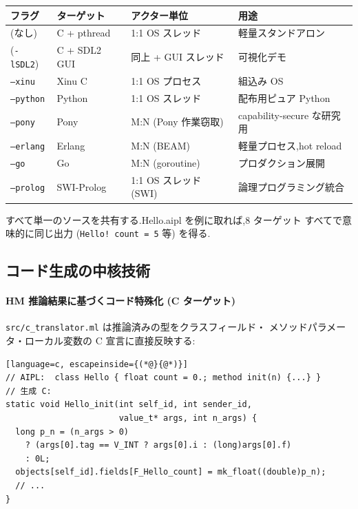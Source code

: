 \documentclass[11pt,a4paper]{article}
\newcommand{\code}[1]{\texttt{\small #1}}
\begin{document}
\begin{longtable}{p{2.7cm} p{2.5cm} p{4.5cm} p{5.5cm}}
  \toprule
  \textbf{フラグ} & \textbf{ターゲット} & \textbf{アクター単位} & \textbf{用途} \\
  \midrule
  \endhead
  (なし)          & C + pthread       & 1:1 OS スレッド & 軽量スタンドアロン \\
  (\code{-lSDL2}) & C + SDL2 GUI      & 同上 + GUI スレッド & 可視化デモ \\
  \code{--xinu}   & Xinu C            & 1:1 OS プロセス  & 組込み OS \\
  \code{--python} & Python            & 1:1 OS スレッド & 配布用ピュア Python \\
  \code{--pony}   & Pony              & M:N (Pony 作業窃取) & capability-secure な研究用 \\
  \code{--erlang} & Erlang            & M:N (BEAM)        & 軽量プロセス,hot reload \\
  \code{--go}     & Go                & M:N (goroutine)   & プロダクション展開 \\
  \code{--prolog} & SWI-Prolog        & 1:1 OS スレッド (SWI) & 論理プログラミング統合 \\
  \bottomrule
\end{longtable}

すべて単一のソースを共有する.Hello.aipl を例に取れば,8 ターゲット
すべてで意味的に同じ出力 (\code{Hello! count = 5} 等) を得る.

\subsection{コード生成の中核技術}

\paragraph{HM 推論結果に基づくコード特殊化 (C ターゲット)}
\code{src/c\_translator.ml} は推論済みの型をクラスフィールド・
メソッドパラメータ・ローカル変数の C 宣言に直接反映する:

\begin{lstlisting}[language=c, escapeinside={(*@}{@*)}]
// AIPL:  class Hello { float count = 0.; method init(n) {...} }
// 生成 C:
static void Hello_init(int self_id, int sender_id,
                       value_t* args, int n_args) {
  long p_n = (n_args > 0)
    ? (args[0].tag == V_INT ? args[0].i : (long)args[0].f)
    : 0L;
  objects[self_id].fields[F_Hello_count] = mk_float((double)p_n);
  // ...
}
\end{lstlisting}
\end{document}
